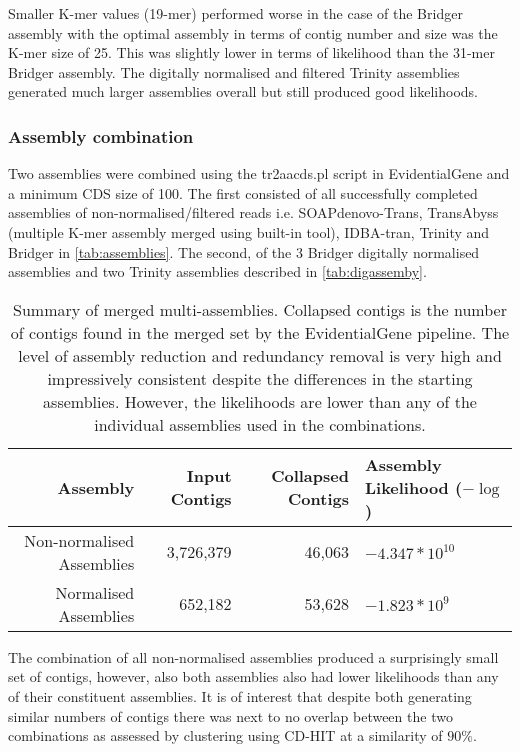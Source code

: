 Smaller K-mer values (19-mer) performed worse in the case of the Bridger assembly
with the optimal assembly in terms of contig number and size was the K-mer size 
of 25.  This was slightly lower in terms of likelihood than the 31-mer Bridger
assembly. The digitally normalised and filtered Trinity assemblies 
generated much larger assemblies overall but still produced good likelihoods.

\subsubsection{Assembly combination}

Two assemblies were combined using the tr2aacds.pl script in EvidentialGene 
and a minimum CDS size of 100. The first consisted of all successfully completed
assemblies of non-normalised/filtered reads i.e. SOAPdenovo-Trans, TransAbyss (multiple K-mer
assembly merged using built-in tool),
IDBA-tran, Trinity and Bridger in \cref{tab:assemblies}.  The second, 
of the 3 Bridger digitally normalised assemblies and two Trinity assemblies 
described in \cref{tab:digassemby}.

\begin{table}[h]
    \begin{tabular}{|r ||r |r | l| }
    	\hline 
        \textbf{Assembly} & \textbf{Input Contigs} & \textbf{Collapsed Contigs} & \textbf{Assembly Likelihood (\(-\log\))}\\ 
        \hline
        Non-normalised Assemblies   & 3,726,379 & 46,063  & \(-4.347*10^{10}\) \\
        Normalised Assemblies       & 652,182 & 53,628 & \(-1.823*10^{9}\)\\
    \hline
    \end{tabular}
    \caption{Summary of merged multi-assemblies.  Collapsed contigs is the number of contigs
    found in the merged set by the EvidentialGene pipeline. The level of assembly
reduction and redundancy removal is very high and impressively consistent despite
the differences in the starting assemblies.  However, the likelihoods are lower than
any of the individual assemblies used in the combinations.}
    \label{tab:comb_assemb}
\end{table}

The combination of all non-normalised assemblies produced a surprisingly small
set of contigs, however, also both assemblies also had lower likelihoods than 
any of their constituent assemblies. It is of interest that despite both
generating similar numbers of contigs there was next to no overlap between 
the two combinations as assessed by clustering using CD-HIT at a similarity of \(90\%\).


